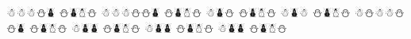 \documentclass{article}
\begin{document}
\begin{whitesnowman}
☃☃☃⛄⛇ %
⛄⛇☃⛄
☃☃☃⛄⛄⛇ %
⛄⛇☃⛄
☃⛇⛄ %
⛄⛇☃⛄
☃⛇☃ %
⛄⛇☃⛄
☃⛄☃☃⛄⛄⛇ %
⛄⛇☃⛄
☃⛇⛇ %
⛄⛇☃⛄
☃⛇⛇ %
⛄⛇☃⛄
☃⛇⛇ %
⛄⛇☃⛄
\end{whitesnowman}
\end{document}
